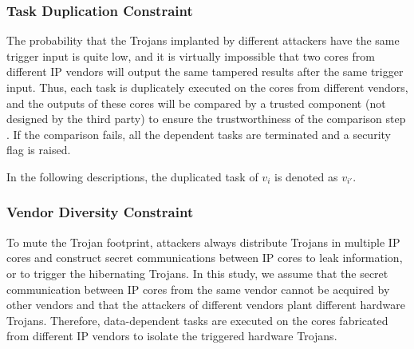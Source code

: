 \documentclass[10pt,journal]{IEEEtran}
\begin{document}
\subsubsection{Task Duplication Constraint}

The probability that the Trojans implanted by different attackers have the same trigger input is quite low, and it is virtually impossible that two cores from different IP vendors will output the same tampered results after the same trigger input. Thus, each task is duplicately executed on the cores from different vendors, and the outputs of these cores will be compared by a trusted component (not designed by the third party) to ensure the trustworthiness of the comparison step \cite{conference:DG}. If the comparison fails, all the dependent tasks are terminated and a security flag is raised.

In the following descriptions, the duplicated task of $v_i$ is denoted as $v_{i'}$.



\subsubsection{Vendor Diversity Constraint}

To mute the Trojan footprint, attackers always distribute Trojans in multiple IP cores and construct secret communications between IP cores to leak information, or to trigger the hibernating Trojans\cite{article:CL}. In this study, we assume that the secret communication between IP cores from the same vendor cannot be acquired by other vendors and that the attackers of different vendors plant different hardware Trojans. Therefore, data-dependent tasks are executed on the cores fabricated from different IP vendors to isolate the triggered hardware Trojans.


\end{document}
